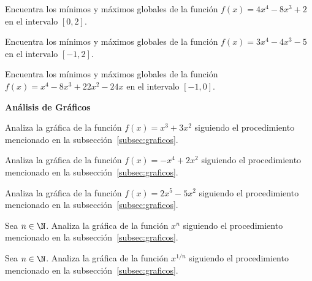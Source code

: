 \documentclass[12pt,a4paper]{book}
\newcommand{\subtitulo}[1]{\par\avoidorphan{5}\addvspace{\medskipamount}\noindent\textbf{#1}\par\nobreak}
\begin{document}
    \begin{ejercicio}\label{ej:287}
        Encuentra los mínimos y máximos globales de la función
        $f(x)=4x^{4}-8x^{3}+2$ en el intervalo $[0,2]$.
    \end{ejercicio}

    \begin{ejercicio}\label{ej:288}
        Encuentra los mínimos y máximos globales de la función
        $f(x)=3x^{4}-4x^{3}-5$ en el intervalo $[-1,2]$.
    \end{ejercicio}

    \begin{ejercicio}\label{ej:289}
        Encuentra los mínimos y máximos globales de la función
        $f(x)=x^{4}-8x^{3}+22x^{2}-24x$ en el intervalo $[-1,0]$.
    \end{ejercicio}

    \subtitulo{Análisis de Gráficos}

    \begin{ejercicio}\label{ej:290}
        Analiza la gráfica de la función $f(x)=x^{3}+3x^{2}$ siguiendo el
        procedimiento mencionado en la subsección~\ref{subsec:graficos}.
    \end{ejercicio}

    \begin{ejercicio}\label{ej:291}
        Analiza la gráfica de la función $f(x)=-x^{4}+2x^{2}$ siguiendo el
        procedimiento mencionado en la subsección~\ref{subsec:graficos}.
    \end{ejercicio}

    \begin{ejercicio}\label{ej:292}
        Analiza la gráfica de la función $f(x)=2x^{5}-5x^{2}$ siguiendo el
        procedimiento mencionado en la subsección~\ref{subsec:graficos}.
    \end{ejercicio}

    \begin{ejercicio}\label{ej:293}
        Sea $n\in\N$. Analiza la gráfica de la función $x^{n}$ siguiendo el
        procedimiento mencionado en la subsección~\ref{subsec:graficos}.
    \end{ejercicio}

    \begin{ejercicio}\label{ej:294}
        Sea $n\in\N$. Analiza la gráfica de la función $x^{1/n}$ siguiendo el
        procedimiento mencionado en la subsección~\ref{subsec:graficos}.
    \end{ejercicio}
\end{document}

